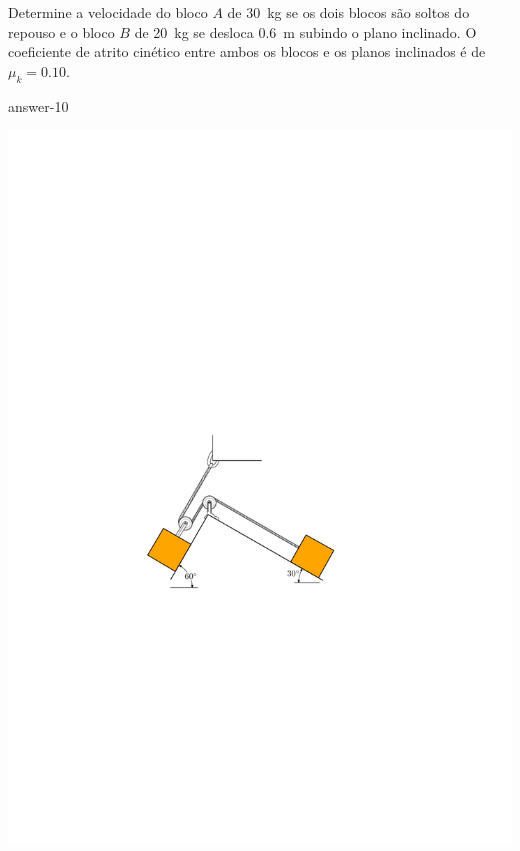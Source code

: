 
\item Determine a velocidade do bloco $A$ de \SI{30}{\kilogram} se os dois blocos são soltos do repouso e o bloco $B$ de \SI{20}{\kilogram} se desloca \SI{0.6}{\meter} subindo o plano inclinado. O coeficiente de atrito cinético entre ambos os blocos e os planos inclinados é de $\mu_{k}=0.10$.

{answer-10}

\vspace{-2cm}
\begin{flushright}
    \includegraphics[scale=1.2]{images/draw_10.pdf}
\end{flushright}